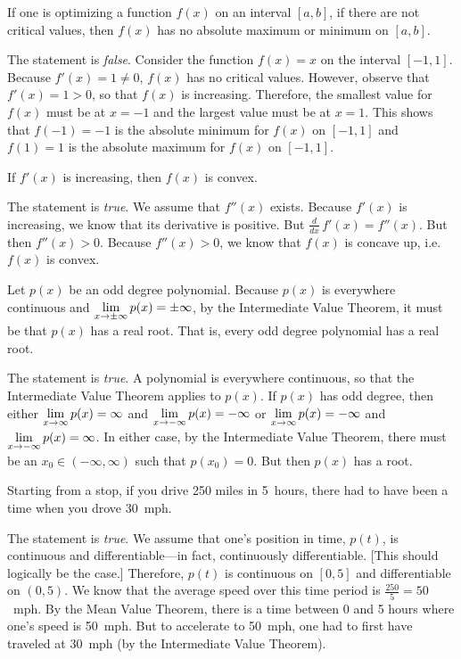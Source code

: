 \documentclass[11pt,letterpaper]{article}
\begin{document}
 If one is optimizing a function $f(x)$ on an interval $[a, b]$, if there are not critical values, then $f(x)$ has no absolute maximum or minimum on $[a, b]$. \pspace

\sol The statement is \textit{false}. Consider the function $f(x)= x$ on the interval $[-1, 1]$. Because $f'(x)= 1 \neq 0$, $f(x)$ has no critical values. However, observe that $f'(x)= 1 > 0$, so that $f(x)$ is increasing. Therefore, the smallest value for $f(x)$ must be at $x= -1$ and the largest value must be at $x= 1$. This shows that $f(-1)= -1$ is the absolute minimum for $f(x)$ on $[-1, 1]$ and $f(1)= 1$ is the absolute maximum for $f(x)$ on $[-1, 1]$. \pvspace{1.3cm}



 If $f'(x)$ is increasing, then $f(x)$ is convex. \pspace

\sol The statement is \textit{true}. We assume that $f''(x)$ exists. Because $f'(x)$ is increasing, we know that its derivative is positive. But $\frac{d}{dx} \,f'(x)= f''(x)$. But then $f''(x) > 0$. Because $f''(x) > 0$, we know that $f(x)$ is concave up, i.e. $f(x)$ is convex. \pvspace{1.3cm}



 Let $p(x)$ be an odd degree polynomial. Because $p(x)$ is everywhere continuous and $\displaystyle\lim_{x \to \pm \infty} p(x)= \pm \infty$, by the Intermediate Value Theorem, it must be that $p(x)$ has a real root. That is, every odd degree polynomial has a real root. \pspace

\sol The statement is \textit{true}. A polynomial is everywhere continuous, so that the Intermediate Value Theorem applies to $p(x)$. If $p(x)$ has odd degree, then either $\displaystyle\lim_{x \to \infty} p(x)= \infty$ and $\displaystyle\lim_{x \to -\infty} p(x)= -\infty$ or $\displaystyle\lim_{x \to \infty} p(x)= -\infty$ and $\displaystyle\lim_{x \to -\infty} p(x)= \infty$. In either case, by the Intermediate Value Theorem, there must be an $x_0 \in (-\infty, \infty)$ such that $p(x_0)= 0$. But then $p(x)$ has a root. \pvspace{1.3cm}



 Starting from a stop, if you drive 250 miles in 5~hours, there had to have been a time when you drove 30~mph. \pspace

\sol The statement is \textit{true}. We assume that one's position in time, $p(t)$, is continuous and differentiable---in fact, continuously differentiable. [This should logically be the case.] Therefore, $p(t)$ is continuous on $[0, 5]$ and differentiable on $(0, 5)$. We know that the average speed over this time period is $\frac{250}{5}= 50$~mph. By the Mean Value Theorem, there is a time between 0 and 5 hours where one's speed is 50~mph. But to accelerate to 50~mph, one had to first have traveled at 30~mph (by the Intermediate Value Theorem). \pvspace{1.3cm}
\end{document}
